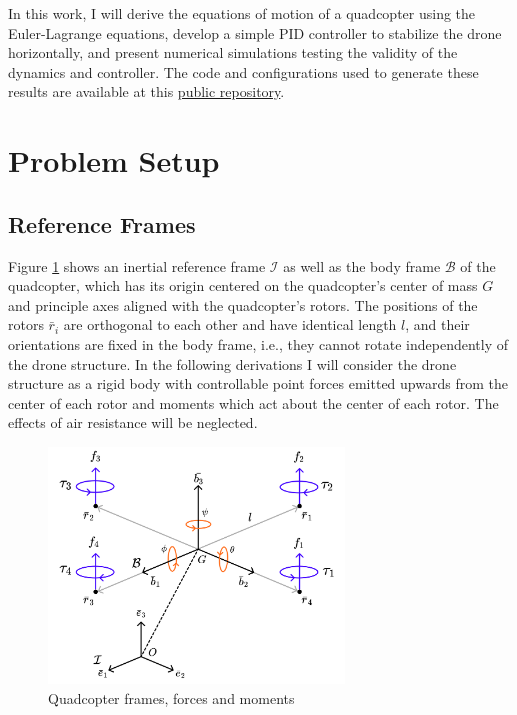 \documentclass{article}
\begin{document}
In this work, I will derive the equations of motion of a quadcopter using the Euler-Lagrange equations, develop a simple PID controller to stabilize the drone horizontally, and present numerical simulations testing the validity of the dynamics and controller. The code and configurations used to generate these results are available at this \href{https://github.com/msc5/quadcopter}{public repository}.

\newpage
\section{Problem Setup}

\newcommand{\stau}{\boldsymbol{\tau}}

\subsection{Reference Frames}

Figure \ref{fig:frames} shows an inertial reference frame $\mathcal{I}$ as well as the body frame $\mathcal{B}$ of the quadcopter, which has its origin centered on the quadcopter's center of mass $G$ and principle axes aligned with the quadcopter's rotors. The positions of the rotors $\bar{r}_i$ are orthogonal to each other and have identical length $l$, and their orientations are fixed in the body frame, i.e., they cannot rotate independently of the drone structure. In the following derivations I will consider the drone structure as a rigid body with controllable point forces emitted upwards from the center of each rotor and moments which act about the center of each rotor. The effects of air resistance will be neglected.

\begin{figure}[H]
    \centering
    \includegraphics[width=0.7\textwidth]{figures/frames.png}
    \caption{Quadcopter frames, forces and moments}
    \label{fig:frames}
\end{figure}
\end{document}
